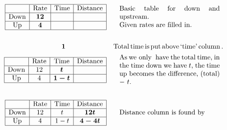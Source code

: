 \begin{example}
  \begin{eqnarray*}
    \begin{array}{|c|c|c|c|}
      \hline
      & \tmop{Rate} & \tmop{Time} & \tmop{Distance}\\
      \hline
      \tmop{Down} & \tmmathbf{12} &  & \\
      \hline
      \tmop{Up} & \tmmathbf{4} &  & \\
      \hline
    \end{array} &  & \begin{array}{p{0.425\textwidth}}
      \tmop{Basic} \tmop{table} \tmop{for} \tmop{down} \tmop{and}
      \tmop{upstream}.\\
      \tmop{Given} \tmop{rates} \tmop{are} \tmop{filled} \tmop{in}.
    \end{array}\\
    &  & \\
    \tmmathbf{1}~~~~~~~~~~~~~~~~~~  &  & \tmop{Total} \tmop{time} \tmop{is} \tmop{put} \tmop{above} \tmop{`time'} \tmop{column}.\\
    \begin{array}{|c|c|c|c|}
      \hline
      & \tmop{Rate} & \tmop{Time} & \tmop{Distance}\\
      \hline
      \tmop{Down} & 12 & \tmmathbf{t} & \\
      \hline
      \tmop{Up} & 4 & \tmmathbf{1 - t} & \\
      \hline
    \end{array} &  & \begin{array}{p{0.425\textwidth}}
      \tmop{As} \tmop{we~only~} \tmop{have} \tmop{the} \tmop{total} \tmop{time}, \tmop{in} \tmop{the} \tmop{time} \tmop{down} \tmop{we} \tmop{have} $t$, \tmop{the} \tmop{time} \tmop{up} \tmop{becomes} \tmop{the}
      \tmop{difference}, \tmop{(total)} $-~t$.
    \end{array}\\
    &  & \\
    \begin{array}{|c|c|c|c|}
      \hline
      & \tmop{Rate} & \tmop{Time} & \tmop{Distance}\\
      \hline
      \tmop{Down} & 12 & t & \tmmathbf{12 t}\\
      \hline
      \tmop{Up} & 4 & 1 - t & \tmmathbf{4 - 4 t}\\
      \hline
    \end{array} &  & \begin{array}{p{0.425\textwidth}}
      \tmop{Distance} \tmop{column} \tmop{is} \tmop{found} \tmop{by}

\end{array}
\end{eqnarray*}
\end{example}
